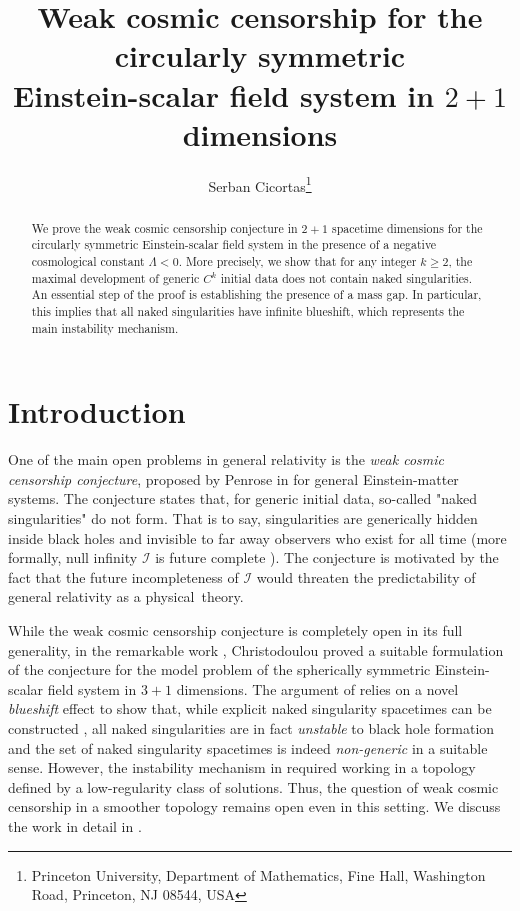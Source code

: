 \documentclass[11pt]{article}
\title{Weak cosmic censorship for the circularly symmetric \\ Einstein-scalar field system in $2+1$ dimensions}
\author{Serban Cicortas\footnote{Princeton University, Department of Mathematics, Fine Hall, Washington Road, Princeton, NJ 08544, USA}}
\numberwithin{equation}{section}
\begin{document}
\maketitle

\begin{abstract}
    We prove the weak cosmic censorship conjecture in $2+1$ spacetime dimensions for the circularly symmetric Einstein-scalar field system in the presence of a negative cosmological constant $\Lambda<0$. More precisely, we show that for any integer $k\geq2$, the maximal development of generic $C^k$ initial data does not contain naked singularities. An essential step of the proof is establishing the presence of a mass gap. In particular, this implies that all naked singularities have infinite blueshift, which represents the main instability mechanism.
\end{abstract}

\tableofcontents

\section{Introduction}

One of the main open problems in general relativity is the \textit{weak cosmic censorship conjecture}, proposed by Penrose in \cite{P69} for general Einstein-matter systems. The conjecture states that, for generic initial data, so-called "naked singularities" do not form. That is to say, singularities are generically hidden inside black holes and invisible to far away observers who exist for all time (more formally, null infinity $\mathcal{I}$ is future complete \cite{GH78, C99-GL}). The conjecture is motivated by the fact that the future incompleteness of $\mathcal{I}$ would threaten the predictability of general relativity as a physical~theory. 

While the weak cosmic censorship conjecture is completely open in its full generality, in the remarkable work \cite{ChrWCC}, Christodoulou proved a suitable formulation of the conjecture for the model problem of the spherically symmetric Einstein-scalar field system in $3+1$ dimensions. The argument of \cite{ChrWCC} relies on a novel \textit{blueshift} effect to show that, while explicit naked singularity spacetimes can be constructed \cite{C94, Cho93}, all naked singularities are in fact \textit{unstable} to black hole formation and the set of naked singularity spacetimes is indeed \textit{non-generic} in a suitable sense. However, the instability mechanism in \cite{ChrWCC} required working in a topology defined by a low-regularity class of solutions. Thus, the question of weak cosmic censorship in a smoother topology remains open even in this setting. We discuss the work \cite{ChrWCC} in detail in .
\end{document}
